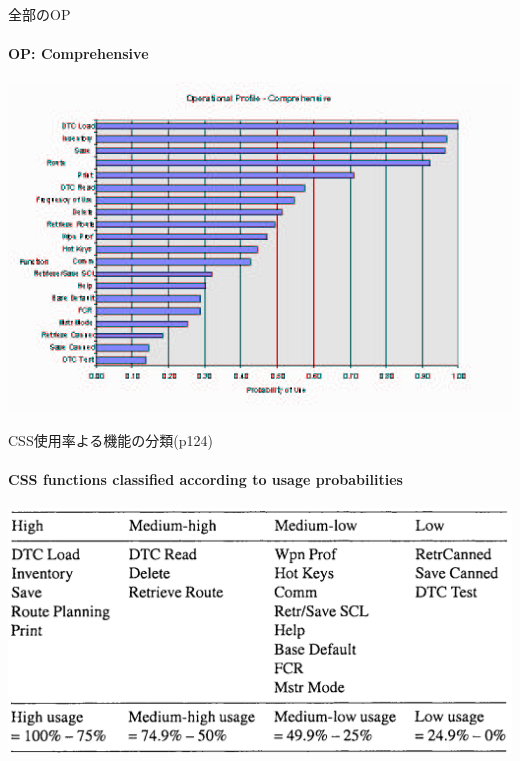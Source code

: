 \begin{frame}{全部のOP}
\framesubtitle{OP: Comprehensive}
\begin{center}
\includegraphics[width=\textwidth,height=0.7\textheight,keepaspectratio]{figure/OPcompre.png}
\end{center}
\end{frame}

\begin{frame}{CSS使用率よる機能の分類(p124)}
\framesubtitle{CSS functions classified according to usage probabilities}
\begin{center}
\includegraphics[width=\textwidth,height=0.7\textheight,keepaspectratio]{figure/CSSfunctions.png}
\end{center}
\end{frame}
